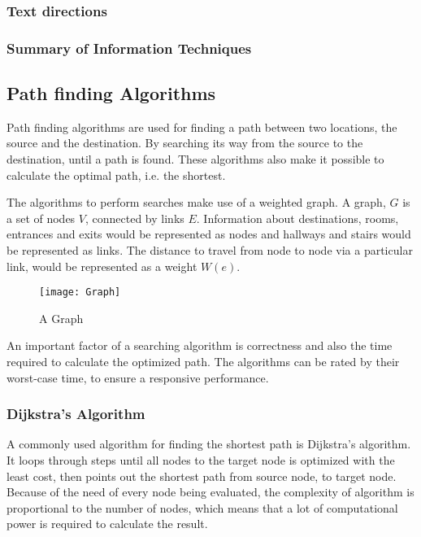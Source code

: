   \subsubsection{Text directions}

  \subsubsection{Summary of Information Techniques}

\newpage

\subsection{Path finding Algorithms}

  Path finding algorithms are used for finding a path between two locations, the source and the destination. By searching its way from the source to the destination, until a path is found. These algorithms also make it possible to calculate the optimal path, i.e. the shortest.

  The algorithms to perform searches make use of a weighted graph. A graph, $G$ is a set of nodes $V$, connected by links $E$.
  Information about destinations, rooms, entrances and exits would be represented as nodes and hallways and stairs would be represented as links. The distance to travel from node to node via a particular link, would be represented as a weight $W(e)$.

  \begin{figure}[ht!]
    \centering
    \texttt{[image: Graph]}
    \caption{A Graph}
    \label{overflow}
  \end{figure}

  An important factor of a searching algorithm is correctness and also the time required to calculate the optimized path.
  The algorithms can be rated by their worst-case time, to ensure a responsive performance.

  \subsubsection{Dijkstra's Algorithm}

  A commonly used algorithm for finding the shortest path is Dijkstra's algorithm. It loops through steps until all nodes to the target node is optimized with the least cost, then points out the shortest path from source node, to target node. Because of the need of every node being evaluated, the complexity of algorithm is proportional to the number of nodes, which means that a lot of computational power is required to calculate the result.  \cite{Dijkstra}

